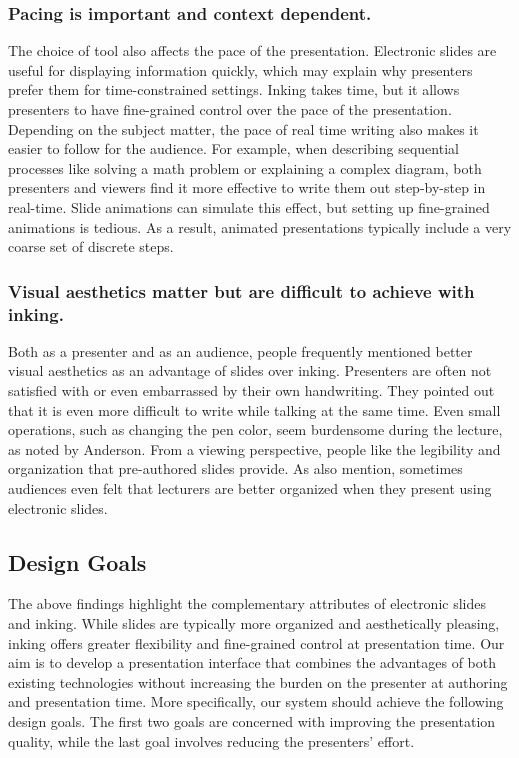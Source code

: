 \subsubsection{Pacing is important and context dependent.} 
The choice of tool also affects the pace of the presentation. Electronic slides are useful for displaying information quickly, which may explain why presenters prefer them for time-constrained settings. Inking takes time, but it allows presenters to have fine-grained control over the pace of the presentation. Depending on the subject matter, the pace of real time writing also makes it easier to follow for the audience. For example, when describing sequential processes like solving a math problem or explaining a complex diagram, both presenters and viewers find it more effective to write them out step-by-step in real-time. Slide animations can simulate this effect, but setting up fine-grained animations is tedious. As a result, animated presentations typically include a very coarse set of discrete steps. 

\subsubsection{Visual aesthetics matter but are difficult to achieve with inking.} 
Both as a presenter and as an audience, people frequently mentioned better visual aesthetics as an advantage of slides over inking. Presenters are often not satisfied with or even embarrassed by their own handwriting. They pointed out that it is even more difficult to write while talking at the same time. Even small operations, such as changing the pen color, seem burdensome during the lecture, as noted by Anderson\cite{anderson2004study}. 
From a viewing perspective, people like the legibility and organization that pre-authored slides provide. As \cite{frey2002learners} also mention, sometimes audiences even felt that lecturers are better organized when they present using electronic slides. 

\subsection{Design Goals}
The above findings highlight the complementary attributes of electronic slides and inking. While slides are typically more organized and aesthetically pleasing, inking offers greater flexibility and fine-grained control at presentation time.
%
Our aim is to develop a presentation interface that combines the advantages of both existing technologies without increasing the burden on the presenter at authoring and presentation time.
%
More specifically, our system should achieve the following design goals. The first two goals are concerned with improving the presentation quality, while the last goal involves reducing the presenters' effort. 

